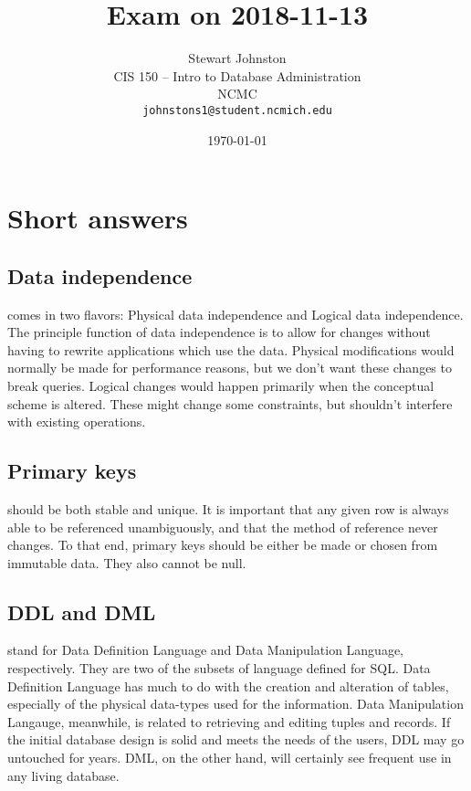 \documentclass{article}
\title{Exam on 2018-11-13}
\author{Stewart Johnston\\
  {CIS 150 -- Intro to Database Administration}\\
  {NCMC}\\
  {\texttt{johnstons1@student.ncmich.edu}}
}
\date{\today}
\begin{document}

\maketitle

\tableofcontents
\listoffigures

\section{Short answers}

	\subsection{Data independence} comes in two flavors: Physical data
	independence and Logical data independence. The principle function of
	data independence is to allow for changes without having to rewrite
	applications which use the data.  Physical modifications would normally
	be made for performance reasons, but we don't want these changes to
	break queries. Logical changes would happen primarily when the
	conceptual scheme is altered. These might change some constraints, but
	shouldn't interfere with existing operations.

	\subsection{Primary keys} should be both stable and unique. It is
	important that any given row is always able to be referenced
	unambiguously, and that the method of reference never changes. To that
	end, primary keys should be either be made or chosen from immutable
	data. They also cannot be null.


	\subsection{DDL and DML} stand for Data Definition Language and Data
	Manipulation Language, respectively. They are two of the subsets of
	language defined for SQL. Data Definition Language has much to do with
	the creation and alteration of tables, especially of the physical
	data-types used for the information. Data Manipulation Langauge,
	meanwhile, is related to retrieving and editing tuples and records. If
	the initial database design is solid and meets the needs of the users,
	DDL may go untouched for years. DML, on the other hand, will certainly
	see frequent use in any living database.
	
\end{document}
